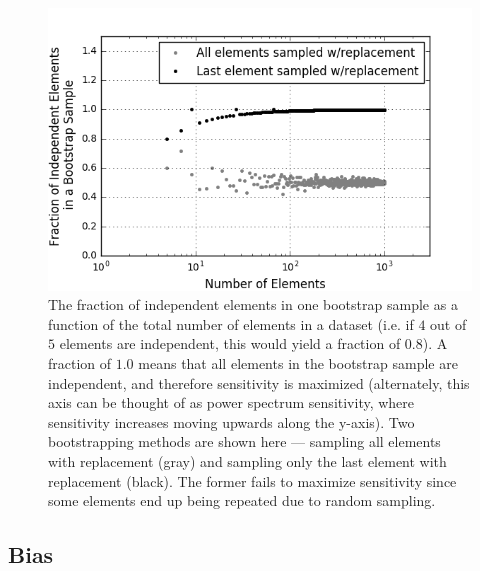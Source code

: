 \documentclass[preprint2,numberedappendix,tighten]{aastex6}  %
\begin{document}
\begin{figure}
	\centering
	\includegraphics[trim={0.3cm 0.3cm 0.3cm 0.3cm},width=\columnwidth]{plots/toy_error2.png}
	\caption{The fraction of independent elements in one bootstrap sample as a function of the total number of elements in a 
dataset (i.e. if $4$ out of $5$ elements are independent, this would yield a fraction of $0.8$). A fraction of $1.0$ means that all 
elements in the bootstrap sample are independent, and therefore sensitivity is maximized (alternately, this axis can be thought 
of as power spectrum sensitivity, where sensitivity increases moving upwards along the y-axis). Two bootstrapping methods are shown here --- sampling all elements with replacement (gray) and sampling only the last element with replacement (black). The former fails to maximize sensitivity since some elements end up being repeated due to random sampling.} 
	\label{fig:toy_error2}
\end{figure}


\subsection{Bias}
\label{sec:BiasOverview}
\end{document}

